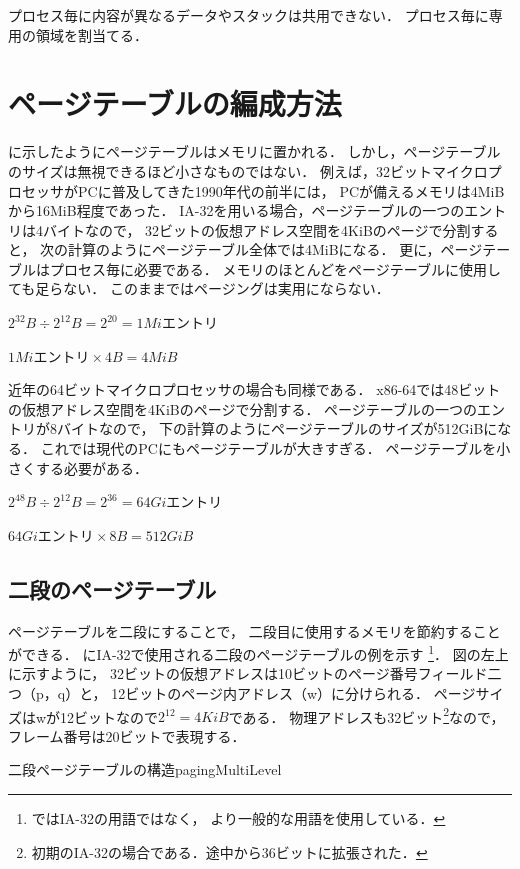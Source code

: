 プロセス毎に内容が異なるデータやスタックは共用できない．
プロセス毎に専用の領域を割当てる．

\section{ページテーブルの編成方法}
に示したようにページテーブルはメモリに置かれる．
しかし，ページテーブルのサイズは無視できるほど小さなものではない．
例えば，32ビットマイクロプロセッサがPCに普及してきた1990年代の前半には，
PCが備えるメモリは4MiBから16MiB程度であった．
IA-32を用いる場合，ページテーブルの一つのエントリは4バイトなので，
32ビットの仮想アドレス空間を4KiBのページで分割すると，
次の計算のようにページテーブル全体では4MiBになる．
更に，ページテーブルはプロセス毎に必要である．
メモリのほとんどをページテーブルに使用しても足らない．
このままではページングは実用にならない．

\centerline{$2^{32}B \div 2^{12}B = 2^{20} = 1Miエントリ$}
\centerline{$1Miエントリ \times 4B = 4MiB$}

近年の64ビットマイクロプロセッサの場合も同様である．
x86-64では48ビットの仮想アドレス空間を4KiBのページで分割する．
ページテーブルの一つのエントリが8バイトなので，
下の計算のようにページテーブルのサイズが512GiBになる．
これでは現代のPCにもページテーブルが大きすぎる．
ページテーブルを小さくする必要がある．

\centerline{$2^{48}B \div 2^{12}B = 2^{36} = 64Giエントリ$}
\centerline{$64Giエントリ \times 8B = 512GiB$}

\subsection{二段のページテーブル}
ページテーブルを二段にすることで，
二段目に使用するメモリを節約することができる．
にIA-32で使用される二段のページテーブルの例を示す
\footnote{ではIA-32の用語ではなく，
より一般的な用語を使用している．}．
図の左上に示すように，
32ビットの仮想アドレスは10ビットのページ番号フィールド二つ（p，q）と，
12ビットのページ内アドレス（w）に分けられる．
ページサイズはwが12ビットなので$2^{12}=4KiB$である．
物理アドレスも32ビット\footnote{
初期のIA-32の場合である．途中から36ビットに拡張された．
}なので，フレーム番号は20ビットで表現する．

{二段ページテーブルの構造}{pagingMultiLevel}

